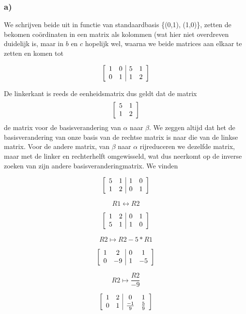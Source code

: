 \documentclass[lineaire_algebra_oplossingen.tex]{subfiles}
\begin{document}
\subsubsection*{a)}
We schrijven beide uit in functie van standaardbasis \{(0,1), (1,0)\}, zetten de bekomen co\"ordinaten in een matrix als kolommen (wat hier niet overdreven duidelijk is, maar in $b$ en $c$ hopelijk wel, waarna we beide matrices aan elkaar te zetten en komen tot

\[
\left[
\begin{array}{ c c | c c }
1 & 0 & 5 & 1\\
0 & 1 & 1 & 2
\end{array}
\right]
\]

De linkerkant is reeds de eenheidsmatrix dus geldt dat de matrix 
\[
\left[
\begin{array}{ c c }
5 & 1\\
1 & 2
\end{array}
\right]
\]
de matrix voor de basisverandering van $\alpha$ naar $\beta$. We zeggen altijd dat het de basisverandering van onze basis van de rechtse matrix is naar die van de linkse matrix. Voor de andere matrix, van $\beta$ naar $\alpha$ rijreduceren we dezelfde matrix, maar met de linker en rechterhelft omgewisseld, wat dus neerkomt op de inverse zoeken van zijn andere basisveranderingmatrix. We vinden

\[
\left[
\begin{array}{ c c | c c }
5 & 1 & 1 & 0\\
1 & 2 & 0 & 1
\end{array}
\right]
\]

\[R1 \leftrightarrow R2 \]

\[
\left[
\begin{array}{ c c | c c }
1 & 2 & 0 & 1\\
5 & 1 & 1 & 0
\end{array}
\right]
\]

\[R2 \mapsto R2 - 5*R1 \]

\[
\left[
\begin{array}{ c c | c c }
1 & 2 & 0 & 1\\
0 & -9 & 1 & -5
\end{array}
\right]
\]

\[R2 \mapsto \frac{R2}{-9} \]

\[
\left[
\begin{array}{ c c | c c }
1 & 2 & 0 & 1\\
0 & 1 & \frac{-1}{9} & \frac{5}{9}
\end{array}
\right]
\]
\end{document}
